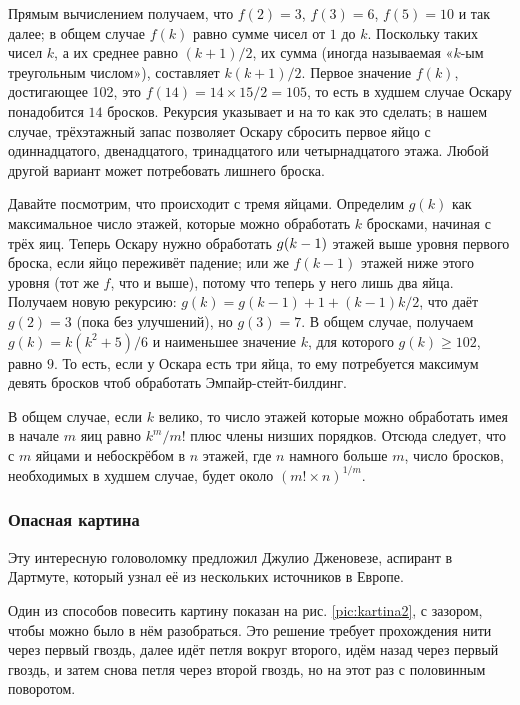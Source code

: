 Прямым вычислением получаем, что $f(2) = 3$, $f(3) = 6$, $f(5) = 10$ и так далее; в общем случае $f(k)$ равно сумме чисел от $1$ до $k$.
Поскольку таких чисел $k$, а их среднее равно $(k + 1)/2$, их сумма (иногда называемая «$k$-ым треугольным числом»), составляет $k(k + 1)/2$.
Первое значение $f(k)$, достигающее 102, это $f(14) = 14 \times 15/2 = 105$, то есть в худшем случае Оскару понадобится $14$ бросков.
Рекурсия указывает и на то как это сделать;
в нашем случае, трёхэтажный запас позволяет Оскару сбросить первое яйцо с одиннадцатого, двенадцатого, тринадцатого или четырнадцатого этажа.
Любой другой вариант может потребовать лишнего броска.

Давайте посмотрим, что происходит с тремя яйцами.
Определим $g(k)$ как максимальное число этажей, которые можно обработать $k$ бросками, начиная с трёх яиц.
Теперь Оскару нужно обработать $g(k \z- 1)$ этажей выше уровня первого броска, если яйцо переживёт падение;
или же $f(k - 1)$ этажей ниже этого уровня (тот же $f$, что и выше), потому что теперь у него лишь два яйца.
Получаем новую рекурсию: $g(k) = g(k-1) + 1 + (k - 1)k/2$, что даёт $g(2) = 3$ (пока без улучшений), но $g(3) = 7$.
В общем случае, получаем $g(k)=k(k^2+5)/6$ и наименьшее значение $k$, для которого 
$g(k)\ge 102$, равно $9$.
То есть, если у Оскара есть три яйца,
то ему потребуется максимум девять бросков чтоб обработать Эмпайр-стейт-билдинг.

В общем случае, если $k$ велико, то число этажей которые можно обработать имея в начале $m$ яиц равно $k^m/m!$ плюс члены низших порядков.
Отсюда следует, что с $m$ яйцами и небоскрёбом в $n$ этажей, где  $n$ намного больше $m$, число бросков, необходимых в худшем случае, будет около $(m!\times n)^{1/m}$.

\subsubsection*{Опасная картина}

Эту интересную головоломку предложил Джулио Дженовезе, аспирант в Дартмуте, который узнал её из нескольких источников в Европе.

Один из способов повесить картину показан на рис. \ref{pic:kartina2}, с зазором, чтобы можно было в нём разобраться.
Это решение требует прохождения нити через первый гвоздь,
далее идёт петля вокруг второго,
идём назад через первый гвоздь, и затем снова петля через второй гвоздь, но на этот раз с половинным поворотом.


